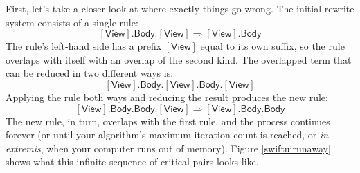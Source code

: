 \documentclass[a4paper,headsepline,bibliography=totoc,toc=flat,fleqn,twoside=semi]{scrbook}
\theoremstyle{definition}
\theoremstyle{definition}
\theoremstyle{definition}
\newcommand{\namesym}[1]{\mathsf{#1}}
\newcommand{\proto}[1]{\bm{\mathsf{#1}}}
\newcommand{\protosym}[1]{[\proto{#1}]}
\begin{document}
First, let's take a closer look at where exactly things go wrong. The initial rewrite system consists of a single rule:
\[\protosym{View}.\namesym{Body}.\protosym{View}\Rightarrow\protosym{View}.\namesym{Body}\]
The rule's left-hand side has a prefix $\protosym{View}$ equal to its own suffix, so the rule overlaps with itself with an overlap of the second kind. The overlapped term that can be reduced in two different ways is:
\[\protosym{View}.\namesym{Body}.\protosym{View}.\namesym{Body}.\protosym{View}\]
Applying the rule both ways and reducing the result produces the new rule:
\[\protosym{View}.\namesym{Body}.\namesym{Body}.\protosym{View}\Rightarrow\protosym{View}.\namesym{Body}.\namesym{Body}\]
The new rule, in turn, overlaps with the first rule, and the process continues forever (or until your algorithm's maximum iteration count is reached, or \emph{in extremis}, when your computer runs out of memory). Figure \ref{swiftuirunaway} shows what this infinite sequence of critical pairs looks like.
\end{document}
